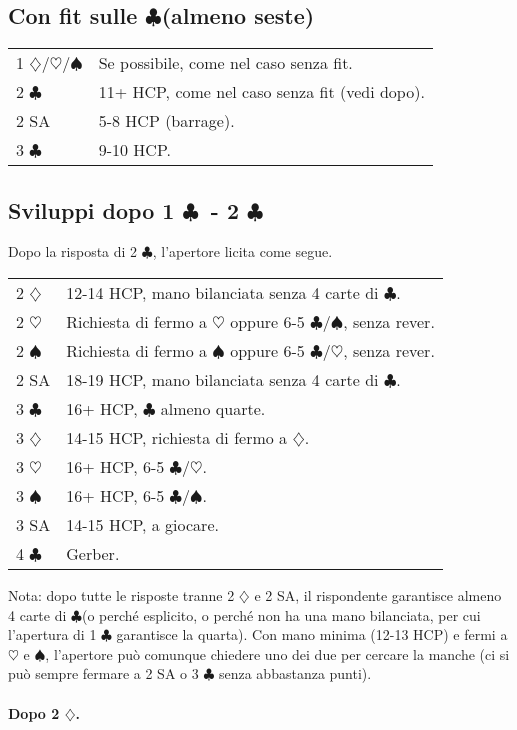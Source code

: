 \documentclass[a4paper,10pt]{article}
\renewcommand{\c}{$\clubsuit$\xspace}
\renewcommand{\d}{$\diamondsuit$\xspace}
\newcommand{\h}{$\heartsuit$\xspace}
\newcommand{\s}{$\spadesuit$\xspace}
\newcommand{\sa}{SA\xspace}
\newcommand{\smallspace}{\vskip0.3cm}
\newenvironment{twocol}
  {\smallspace\noindent\begin{tabular}{l p{0.78\textwidth}}}
  {\end{tabular}\smallspace}
\begin{document}
\subsection{Con fit sulle \c (almeno seste)}

\begin{twocol}
	1 \d/\h/\s & Se possibile, come nel caso senza fit. \\
	2 \c & 11+ HCP, come nel caso senza fit (vedi dopo). \\
	2 \sa & 5-8 HCP (barrage). \\ %
	3 \c & 9-10 HCP. \\
\end{twocol}

\subsection{Sviluppi dopo 1 \c\ - 2 \c} Dopo la risposta di 2 \c, l'apertore licita come segue.

\begin{twocol}
	2 \d & 12-14 HCP, mano bilanciata senza 4 carte di \c. \\
	2 \h & Richiesta di fermo a \h oppure 6-5 \c/\s, senza rever. \\
	2 \s & Richiesta di fermo a \s oppure 6-5 \c/\h, senza rever. \\
	2 SA & 18-19 HCP, mano bilanciata senza 4 carte di \c. \\
	3 \c & 16+ HCP, \c almeno quarte. \\
	3 \d & 14-15 HCP, richiesta di fermo a \d. \\
	3 \h & 16+ HCP, 6-5 \c/\h. \\
	3 \s & 16+ HCP, 6-5 \c/\s. \\
	3 \sa & 14-15 HCP, a giocare. \\
	4 \c & Gerber.
\end{twocol}

Nota: dopo tutte le risposte tranne 2 \d e 2 \sa, il rispondente garantisce almeno 4 carte di \c (o perché esplicito, o perché non ha una mano bilanciata, per cui l'apertura di 1 \c garantisce la quarta). Con mano minima (12-13 HCP) e fermi a \h e \s, l'apertore può comunque chiedere uno dei due per cercare la manche (ci si può sempre fermare a 2 \sa o 3 \c senza abbastanza punti).

\paragraph{Dopo 2 \d.}
\end{document}
